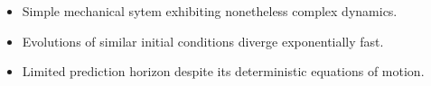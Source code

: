 \documentclass[usenames,dvipsnames,svgnames,10pt,aspectratio=169]{beamer}
\begin{document}
\begin{frame}[t, c]{}{}
	\vspace{-1cm}  
\end{frame}

\begin{frame}[t, c]{}{}
	\begin{minipage}{.48\textwidth}
		\begin{itemize}
			\item Simple mechanical sytem exhibiting nonetheless complex dynamics.

			\bigskip

			\item Evolutions of similar initial conditions diverge exponentially fast.

			\bigskip

			\item Limited prediction horizon despite its deterministic equations of motion.
		\end{itemize}
	\end{minipage}%
	\hfill
	\begin{minipage}{.48\textwidth}
		\vspace{-0.25cm}
		\begin{center}
		\end{center}
	\end{minipage}

	\vspace{-1cm}
\end{frame}
\end{document}
